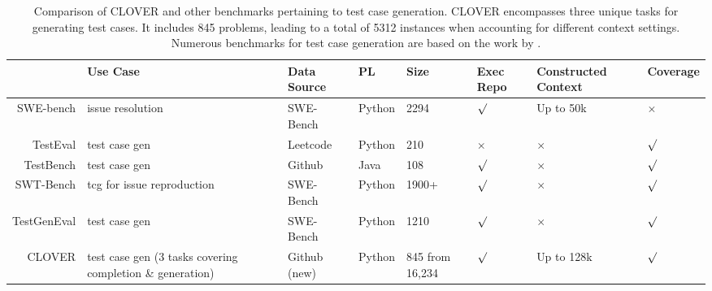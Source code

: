 
   \begin{table*}[!ht]
   \centering
   \scriptsize
   \setlength{\tabcolsep}{3pt}

   \begin{tabularx}{\textwidth}{r|p{3.5cm}|p{1.6cm}|p{1.0cm}|p{1.6cm}|p{0.7cm}|p{2cm}|p{1.4cm}} %
   \toprule
               & Use Case & Data Source & PL & Size & Exec Repo & Constructed Context & Coverage \\ \midrule
   SWE-bench \cite{swebench} & issue resolution & SWE-Bench & Python & 2294 & $\surd$ & Up to 50k &$\times$\\ 
   TestEval  \cite{testeval}  & test case gen & Leetcode & Python & 210 &$\times$& $\times$ & $\surd$ \\ 
   TestBench \cite{testbench}  & test case gen & Github & Java & 108 & $\surd$ &$\times$& $\surd$ \\ 
   SWT-Bench \cite{swtbench} & tcg for issue reproduction & SWE-Bench & Python & 1900+ & $\surd$ &$\times$& $\surd$ \\ 
   TestGenEval \cite{jain2024testgenevalrealworldunit} & test case gen & SWE-Bench & Python & 1210 & $\surd$ &$\times$& $\surd$ \\ \midrule
   CLOVER & test case gen (3 tasks covering completion \& generation) & Github (new) & Python & 845 from 16,234 & $\surd$ & Up to 128k & $\surd$ \\   \bottomrule
   \end{tabularx}
   \caption{Comparison of CLOVER and other benchmarks pertaining to test case generation. CLOVER encompasses three unique tasks for generating test cases. It includes 845 problems, leading to a total of 5312 instances when accounting for different context settings. Numerous benchmarks for test case generation are based on the work by \citet{swebench}.}
   \label{tb:related}
   \end{table*}
   
